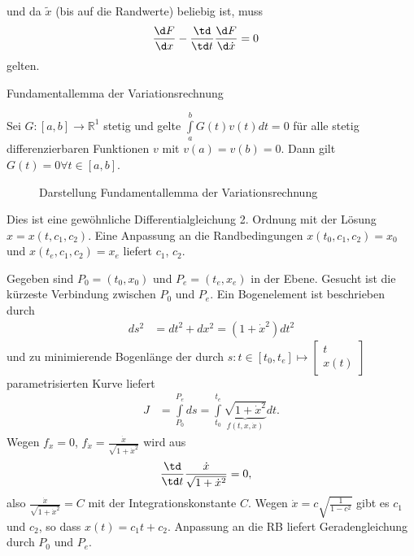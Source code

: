 und da $\tilde{x}$ (bis auf die Randwerte) beliebig ist, muss 
\begin{align}
	\frac{\d F}{\d x}-\frac{\td}{\td t}\frac{\d F}{\d\dot{x}} & = 0 \label{eqn:kap_2_euler_lag_dgl}
\end{align}
gelten.
\begin{remark}{Fundamentallemma der Variationsrechnung}

Sei $G:\left[a,b \right]\rightarrow\mathbb{R}^1$ stetig und gelte $\int\limits_a^b G(t)v(t)dt=0$ für alle stetig differenzierbaren Funktionen $v$ mit
$v(a)=v(b)=0$. Dann gilt $G(t)=0\forall t\in\left[a,b \right]$.
\begin{figure}[htb]
	\centering
	
	\caption{Darstellung Fundamentallemma der Variationsrechnung}
	\label{fig:kap_2_fundlemma_var}
\end{figure}
\end{remark}
Dies ist eine gewöhnliche Differentialgleichung 2. Ordnung mit der Lösung $x=x(t,c_1,c_2)$. Eine Anpassung an die Randbedingungen $x(t_0,c_1,c_2)=x_0$
und $x(t_e,c_1,c_2)=x_e$ liefert $c_1$, $c_2$.
\begin{exmp}
Gegeben sind $P_0=(t_0,x_0)$ und $P_e=(t_e,x_e)$ in der Ebene. Gesucht ist die kürzeste Verbindung zwischen $P_0$ und $P_e$. Ein Bogenelement ist
beschrieben durch 
\begin{align*}
	ds^2 & = dt^2 + dx^2 = \left(1+\dot{x}^2 \right)dt^2
\end{align*}
und zu minimierende Bogenlänge der durch $s:t\in\left[t_0,t_e \right]\mapsto \begin{bmatrix}
t\\ x(t)
\end{bmatrix}$ parametrisierten Kurve liefert
\begin{align*}
	J  & = \int\limits_{P_0}^{P_e}ds=\int\limits_{t_0}^{t_e}\underbrace{\sqrt{1+\dot{x}^2}}_{f(t,x,\dot{x})}dt.
\end{align*}
Wegen $f_x=0$, $f_{\dot{x}}=\frac{\dot{x}}{\sqrt{1+\dot{x}^2}}$ wird aus  
\begin{align*}
	\frac{\td}{\td t}\frac{\dot{x}}{\sqrt{1+\dot{x}^2}} & = 0,
\end{align*}
also $\frac{\dot{x}}{\sqrt{1+\dot{x}^2}}=C$ mit der Integrationskonstante $C$. Wegen $\dot{x}=c\sqrt{\frac{1}{1-c^2}}$ gibt es $c_1$ und $c_2$, so
dass $x(t)=c_1 t+c_2$. Anpassung an die \ac{RB} liefert Geradengleichung durch $P_0$ und $P_e$.
\end{exmp}
